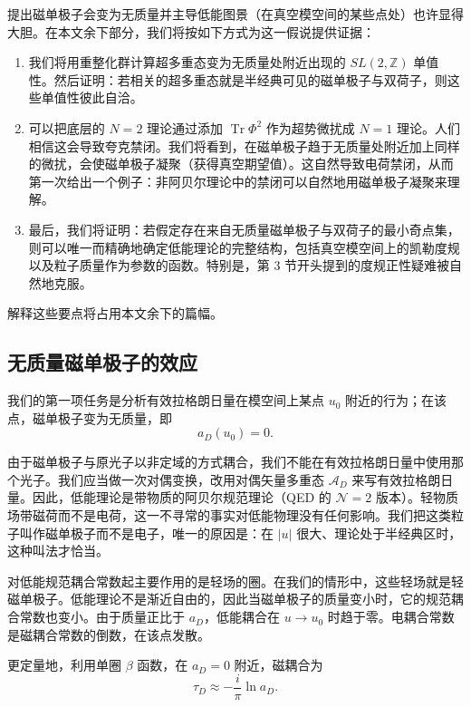 \documentclass[11pt,a4paper,UTF8,fontset=fandol]{ctexart}
\theoremstyle{plain}
\theoremstyle{definition}
\newcommand{\Z}{\mathbb{Z}}
\newcommand{\Tr}{\operatorname{Tr}}
\newcommand{\Nc}{\mathcal{N}}
\def\Nc{N}%
\begin{document}
提出磁单极子会变为无质量并主导低能图景（在真空模空间的某些点处）也许显得大胆。在本文余下部分，我们将按如下方式为这一假说提供证据：
\begin{enumerate}
\item 我们将用重整化群计算超多重态变为无质量处附近出现的 $SL(2,\Z)$ 单值性。然后证明：若相关的超多重态就是半经典可见的磁单极子与双荷子，则这些单值性彼此自洽。
\item 可以把底层的 $\Nc=2$ 理论通过添加 $\Tr\Phi^2$ 作为超势微扰成 $\Nc=1$ 理论。人们相信这会导致夸克禁闭。我们将看到，在磁单极子趋于无质量处附近加上同样的微扰，会使磁单极子凝聚（获得真空期望值）。这自然导致电荷禁闭，从而第一次给出一个例子：非阿贝尔理论中的禁闭可以自然地用磁单极子凝聚来理解。
\item 最后，我们将证明：若假定存在来自无质量磁单极子与双荷子的最小奇点集，则可以唯一而精确地确定低能理论的完整结构，包括真空模空间上的凯勒度规以及粒子质量作为参数的函数。特别是，第 3 节开头提到的度规正性疑难被自然地克服。
\end{enumerate}




解释这些要点将占用本文余下的篇幅。

\subsection{无质量磁单极子的效应}

我们的第一项任务是分析有效拉格朗日量在模空间上某点 $u_0$ 附近的行为；在该点，磁单极子变为无质量，即
\begin{equation}
    a_D(u_0)=0. \tag{5.7}
\end{equation}

由于磁单极子与原光子以非定域的方式耦合，我们不能在有效拉格朗日量中使用那个光子。我们应当做一次对偶变换，改用对偶矢量多重态 $\mathcal A_D$ 来写有效拉格朗日量。因此，低能理论是带物质的阿贝尔规范理论（QED 的 $\mathcal N=2$ 版本）。轻物质场带磁荷而不是电荷，这一不寻常的事实对低能物理没有任何影响。我们把这类粒子叫作磁单极子而不是电子，唯一的原因是：在 $|u|$ 很大、理论处于半经典区时，这种叫法才恰当。

对低能规范耦合常数起主要作用的是轻场的圈。在我们的情形中，这些轻场就是轻磁单极子。低能理论不是渐近自由的，因此当磁单极子的质量变小时，它的规范耦合常数也变小。由于质量正比于 $a_D$，低能耦合在 $u\to u_0$ 时趋于零。电耦合常数是磁耦合常数的倒数，在该点发散。

更定量地，利用单圈 $\beta$ 函数，在 $a_D=0$ 附近，磁耦合为
\begin{equation}
    \tau_D \approx -\frac{i}{\pi}\ln a_D. \tag{5.8}
\end{equation}
\end{document}
